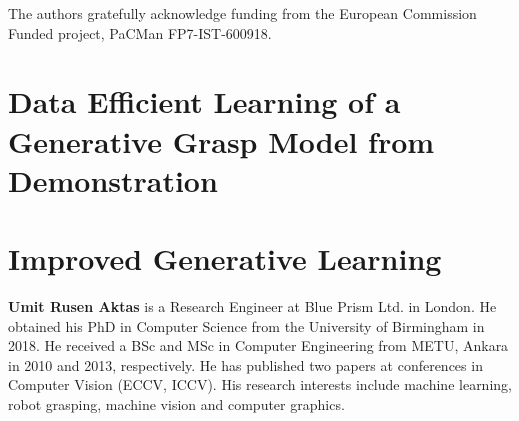 \documentclass{ws-ijhr}
\begin{document}
The authors gratefully acknowledge funding from the European Commission Funded project, PaCMan FP7-IST-600918.

\appendix

\section{Data Efficient Learning of a Generative Grasp Model from Demonstration}

 \label{section:generative}

\section{Improved Generative Learning}

 \label{section:generative_new}


\vspace*{-5pt}   %


\eject


\noindent%
\parbox{5truein}{
\begin{minipage}[b]{1truein}
\centerline{{}}
\end{minipage}
\hfill         %
\begin{minipage}[b]{3.85truein}
{{\bf Umit Rusen Aktas} is a Research Engineer at Blue Prism Ltd. in London. He obtained his PhD in Computer Science from the University of Birmingham in 2018. He received a BSc and MSc in Computer Engineering from METU, Ankara in 2010 and 2013, respectively. He has published two papers at conferences in Computer Vision (ECCV, ICCV). His research interests include machine learning, robot grasping, machine vision and computer graphics.\hfilneg}
\end{minipage}} %
\end{document}
